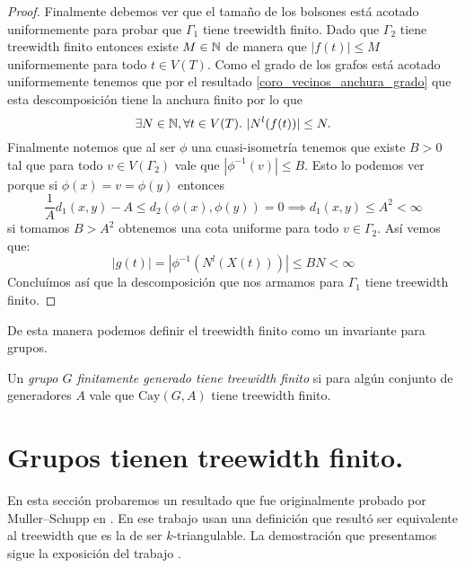 \documentclass[tesis.tex]{subfiles}
\begin{document}
\begin{proof}
	Finalmente debemos ver que el tamaño de los bolsones está acotado uniformemente para probar que $\Gamma_{1}$ tiene treewidth finito.
	Dado que $\Gamma_2$ tiene treewidth finito entonces existe $M \in \mathbb{N}$ de manera que  $|f(t)| \le M$ uniformemente para todo $t \in V(T)$. 
	Como el grado de los grafos está acotado uniformemente tenemos que por el resultado \ref{coro_vecinos_anchura_grado} que esta descomposición tiene la anchura finito por lo que
	\[
	\exists N \in \mathbb{N}, \forall t \in V(T). \  |N^l(f(t))| \le N.
	\]
	Finalmente notemos que al ser $\phi$ una cuasi-isometría tenemos que existe $B > 0$ tal que para todo $v \in V(\Gamma_2)$ vale que $|\phi^{-1}(v)| \le B$.
	Esto lo podemos ver porque si $\phi(x) = v = \phi(y)$ entonces
	\[
	\frac{1}{A}d_{1}(x,y) - A \le d_{2}(\phi(x), \phi(y) ) = 0 \implies d_{1}(x,y) \le A^2 < \infty
	\]
	si tomamos $B > A^2$ obtenemos una cota uniforme para todo $v \in \Gamma_2$. 
	Así vemos que:
	\[
	|g(t)| = |\phi^{-1}(N^l(X(t)))| \le BN < \infty
	\]
	Concluímos así que la descomposición que nos armamos para $\Gamma_1$ tiene treewidth finito.
\end{proof}

De esta manera podemos definir el treewidth finito como un invariante para grupos.

\begin{deff}
	Un \emph{grupo $G$ finitamente generado tiene treewidth finito} si para algún conjunto de generadores $A$ vale que $\text{Cay}(G,A)$ tiene treewidth finito.
\end{deff}


\section{Grupos \ic tienen treewidth finito.}\label{secc_MuSch}

En esta sección probaremos un resultado que fue originalmente probado por Muller--Schupp en \cite{muller1985theory}.
En ese trabajo usan una definición que resultó ser equivalente al treewidth que es la de ser $k$-triangulable.
La demostración que presentamos sigue la exposición del trabajo \cite{diekert2017context}.
\end{document}
